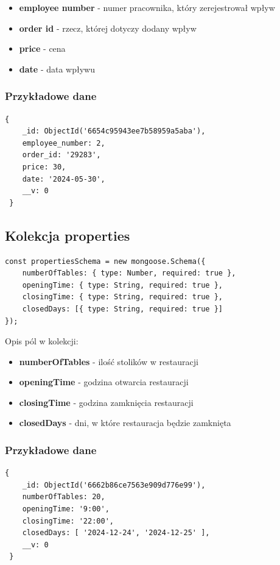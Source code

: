 \documentclass[12pt]{article}
\begin{document}
\begin{itemize}
	\item \textbf{employee number} - numer pracownika, który zerejestrował wpływ
	\item \textbf{order id} - rzecz, której dotyczy dodany wpływ
	\item \textbf{price} - cena
	\item \textbf{date} - data wpływu
\end{itemize}

\subsubsection{Przykładowe dane}
\begin{lstlisting}[]
 {
    _id: ObjectId('6654c95943ee7b58959a5aba'),
    employee_number: 2,
    order_id: '29283',
    price: 30,
    date: '2024-05-30',
    __v: 0
 }
\end{lstlisting}

\newpage
\begin{samepage}
\subsection{Kolekcja properties}

\begin{lstlisting}[caption={Properties}]
const propertiesSchema = new mongoose.Schema({
    numberOfTables: { type: Number, required: true },
    openingTime: { type: String, required: true },
    closingTime: { type: String, required: true },
    closedDays: [{ type: String, required: true }]
});
\end{lstlisting}
\end{samepage}
Opis pól w kolekcji:

\begin{itemize}
	\item \textbf{numberOfTables} - ilość stolików w restauracji
	\item \textbf{openingTime} - godzina otwarcia restauracji
	\item \textbf{closingTime} - godzina zamknięcia restauracji
	\item \textbf{closedDays} - dni, w które restauracja będzie zamknięta
\end{itemize}

\subsubsection{Przykładowe dane}
\begin{lstlisting}[]
 {
    _id: ObjectId('6662b86ce7563e909d776e99'),
    numberOfTables: 20,
    openingTime: '9:00',
    closingTime: '22:00',
    closedDays: [ '2024-12-24', '2024-12-25' ],
    __v: 0
 }
\end{lstlisting}
\end{document}
